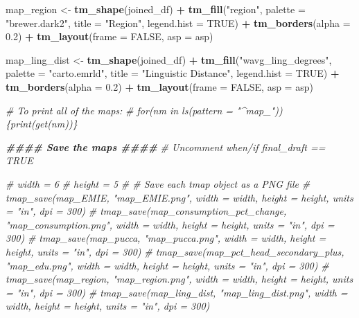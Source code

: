 \documentclass[
]{article}
\newenvironment{Shaded}{\begin{snugshade}}{\end{snugshade}}
\newcommand{\AttributeTok}[1]{\textcolor[rgb]{0.13,0.29,0.53}{#1}}
\newcommand{\CommentTok}[1]{\textcolor[rgb]{0.56,0.35,0.01}{\textit{#1}}}
\newcommand{\ConstantTok}[1]{\textcolor[rgb]{0.56,0.35,0.01}{#1}}
\newcommand{\DocumentationTok}[1]{\textcolor[rgb]{0.56,0.35,0.01}{\textbf{\textit{#1}}}}
\newcommand{\FloatTok}[1]{\textcolor[rgb]{0.00,0.00,0.81}{#1}}
\newcommand{\FunctionTok}[1]{\textcolor[rgb]{0.13,0.29,0.53}{\textbf{#1}}}
\newcommand{\NormalTok}[1]{#1}
\newcommand{\OtherTok}[1]{\textcolor[rgb]{0.56,0.35,0.01}{#1}}
\newcommand{\SpecialCharTok}[1]{\textcolor[rgb]{0.81,0.36,0.00}{\textbf{#1}}}
\newcommand{\StringTok}[1]{\textcolor[rgb]{0.31,0.60,0.02}{#1}}
\begin{document}
\begin{Shaded}
\begin{Highlighting}[]
\NormalTok{map\_region }\OtherTok{\textless{}{-}} \FunctionTok{tm\_shape}\NormalTok{(joined\_df) }\SpecialCharTok{+}
  \FunctionTok{tm\_fill}\NormalTok{(}\StringTok{"region"}\NormalTok{, }\AttributeTok{palette =} \StringTok{"brewer.dark2"}\NormalTok{, }\AttributeTok{title =} \StringTok{"Region"}\NormalTok{, }\AttributeTok{legend.hist =} \ConstantTok{TRUE}\NormalTok{) }\SpecialCharTok{+} 
  \FunctionTok{tm\_borders}\NormalTok{(}\AttributeTok{alpha =} \FloatTok{0.2}\NormalTok{) }\SpecialCharTok{+}
  \FunctionTok{tm\_layout}\NormalTok{(}\AttributeTok{frame =} \ConstantTok{FALSE}\NormalTok{, }\AttributeTok{asp =}\NormalTok{ asp)}


\NormalTok{map\_ling\_dist }\OtherTok{\textless{}{-}} \FunctionTok{tm\_shape}\NormalTok{(joined\_df) }\SpecialCharTok{+}
  \FunctionTok{tm\_fill}\NormalTok{(}\StringTok{"wavg\_ling\_degrees"}\NormalTok{, }\AttributeTok{palette =} \StringTok{"carto.emrld"}\NormalTok{, }\AttributeTok{title =} \StringTok{"Linguistic Distance"}\NormalTok{, }\AttributeTok{legend.hist =} \ConstantTok{TRUE}\NormalTok{) }\SpecialCharTok{+} 
  \FunctionTok{tm\_borders}\NormalTok{(}\AttributeTok{alpha =} \FloatTok{0.2}\NormalTok{) }\SpecialCharTok{+}
  \FunctionTok{tm\_layout}\NormalTok{(}\AttributeTok{frame =} \ConstantTok{FALSE}\NormalTok{, }\AttributeTok{asp =}\NormalTok{ asp)}


\CommentTok{\# To print all of the maps:}
\CommentTok{\# for(nm in ls(pattern = "\^{}map\_")) \{print(get(nm))\}}


\DocumentationTok{\#\#\#\# Save the maps \#\#\#\#}
\CommentTok{\# Uncomment when/if final\_draft == TRUE}

\CommentTok{\# width = 6}
\CommentTok{\# height = 5}
\CommentTok{\# \# Save each tmap object as a PNG file}
\CommentTok{\# tmap\_save(map\_EMIE, "map\_EMIE.png", width = width, height = height, units = "in", dpi = 300)}
\CommentTok{\# tmap\_save(map\_consumption\_pct\_change, "map\_consumption.png", width = width, height = height, units = "in", dpi = 300)}
\CommentTok{\# tmap\_save(map\_pucca, "map\_pucca.png", width = width, height = height, units = "in", dpi = 300)}
\CommentTok{\# tmap\_save(map\_pct\_head\_secondary\_plus, "map\_edu.png", width = width, height = height, units = "in", dpi = 300)}
\CommentTok{\# tmap\_save(map\_region, "map\_region.png", width = width, height = height, units = "in", dpi = 300)}
\CommentTok{\# tmap\_save(map\_ling\_dist, "map\_ling\_dist.png", width = width, height = height, units = "in", dpi = 300)}
\end{Highlighting}
\end{Shaded}
\end{document}
